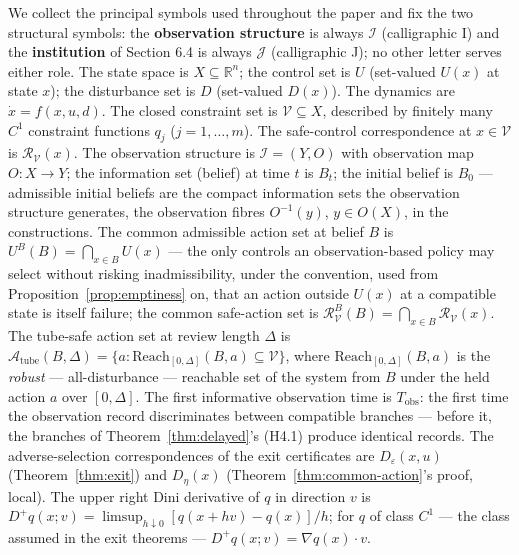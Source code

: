 \documentclass[11pt]{article}
\theoremstyle{definition}
\begin{document}
We collect the principal symbols used throughout the paper and fix the two structural symbols: the \textbf{observation structure} is always
\(\mathcal{I}\) (calligraphic I) and the \textbf{institution} of Section
6.4 is always \(\mathcal{J}\) (calligraphic J); no other letter serves either role. The state space is \(X \subseteq \mathbb{R}^n\); the
control set is \(U\) (set-valued \(U(x)\) at state \(x\)); the
disturbance set is \(D\) (set-valued \(D(x)\)). The dynamics are
\(\dot x = f(x,u,d)\). The closed constraint set is
\(\mathcal{V} \subseteq X\), described by finitely many \(C^1\)
constraint functions \(q_j\) (\(j = 1,\ldots,m\)). The safe-control
correspondence at \(x \in \mathcal{V}\) is
\(\mathcal{R}_{\mathcal{V}}(x)\). The observation structure is
\(\mathcal{I} = (Y, O)\) with observation map \(O : X \to Y\); the
information set (belief) at time \(t\) is \(B_t\); the initial belief is
\(B_0\) --- admissible initial beliefs are the compact information sets
the observation structure generates, the observation fibres
\(O^{-1}(y)\), \(y \in O(X)\), in the constructions. The common
admissible action set at belief \(B\) is
\(U^B(B) = \bigcap_{x \in B} U(x)\) --- the only controls an
observation-based policy may select without risking inadmissibility,
under the convention, used from Proposition~\ref{prop:emptiness} on, that an action outside
\(U(x)\) at a compatible state is itself failure; the common safe-action
set is
\(\mathcal{R}_{\mathcal{V}}^B(B) = \bigcap_{x \in B} \mathcal{R}_{\mathcal{V}}(x)\).
The tube-safe action set at review length \(\Delta\) is
\(\mathcal{A}_{\mathrm{tube}}(B, \Delta) = \{ a : \mathrm{Reach}_{[0,\Delta]}(B, a) \subseteq \mathcal{V} \}\),
where \(\mathrm{Reach}_{[0,\Delta]}(B, a)\) is the \emph{robust} ---
all-disturbance --- reachable set of the system from \(B\) under the
held action \(a\) over \([0,\Delta]\). The first informative observation
time is \(T_{\mathrm{obs}}\): the first time the observation record
discriminates between compatible branches --- before it, the branches of
Theorem~\ref{thm:delayed}'s (H4.1) produce identical records. The adverse-selection
correspondences of the exit certificates are \(D_{\varepsilon}(x, u)\)
(Theorem~\ref{thm:exit}) and \(D_{\eta}(x)\) (Theorem~\ref{thm:common-action}'s proof, local). The upper
right Dini derivative of \(q\) in direction \(v\) is
\(D^+ q(x; v) = \limsup_{h \downarrow 0} [q(x + hv) - q(x)]/h\); for
\(q\) of class \(C^1\) --- the class assumed in the exit theorems ---
\(D^+ q(x; v) = \nabla q(x) \cdot v\).
\end{document}
